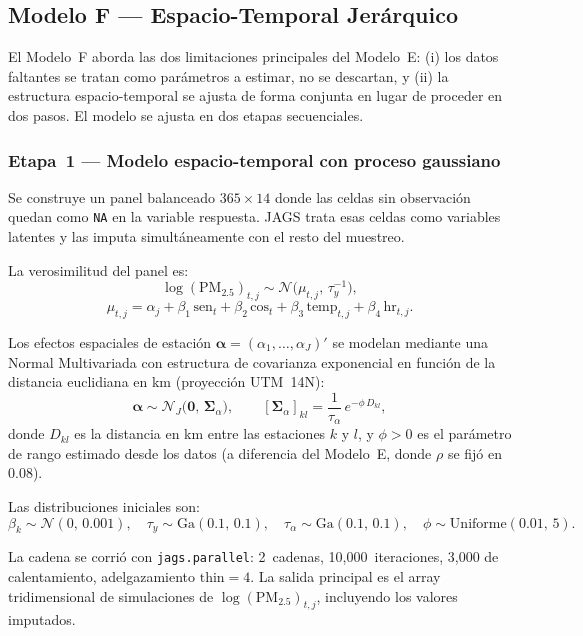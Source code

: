 \documentclass[12pt]{article}
\begin{document}
\subsection{Modelo F --- Espacio-Temporal Jer\'arquico}

El Modelo~F aborda las dos limitaciones principales del Modelo~E:
(i) los datos faltantes se tratan como par\'ametros a estimar, no se
descartan, y (ii) la estructura espacio-temporal se ajusta de forma
conjunta en lugar de proceder en dos pasos.
El modelo se ajusta en dos etapas secuenciales.

\subsubsection*{Etapa~1 --- Modelo espacio-temporal con proceso gaussiano}

Se construye un panel balanceado $365 \times 14$ donde las celdas
sin observaci\'on quedan como \texttt{NA} en la variable respuesta.
JAGS trata esas celdas como variables latentes y las imputa
simult\'aneamente con el resto del muestreo.

La verosimilitud del panel es:
\[
  \log(\text{PM}_{2.5})_{t,j} \sim \mathcal{N}\!\bigl(\mu_{t,j},\,\tau_y^{-1}\bigr),
\]
\[
  \mu_{t,j} = \alpha_j + \beta_1\,\text{sen}_t + \beta_2\,\text{cos}_t
              + \beta_3\,\text{temp}_{t,j} + \beta_4\,\text{hr}_{t,j}.
\]

Los efectos espaciales de estaci\'on $\boldsymbol\alpha = (\alpha_1,\ldots,\alpha_J)'$
se modelan mediante una Normal Multivariada con estructura de covarianza
exponencial en funci\'on de la distancia euclidiana en km (proyecci\'on UTM~14N):
\[
  \boldsymbol\alpha \sim \mathcal{N}_J\!\bigl(\mathbf{0},\,
  \boldsymbol\Sigma_\alpha\bigr), \qquad
  [\boldsymbol\Sigma_\alpha]_{kl} = \frac{1}{\tau_\alpha}\,e^{-\phi\, D_{kl}},
\]
donde $D_{kl}$ es la distancia en km entre las estaciones $k$ y $l$,
y $\phi > 0$ es el par\'ametro de rango estimado desde los datos
(a diferencia del Modelo~E, donde $\rho$ se fij\'o en 0.08\textdegree).

Las distribuciones iniciales son:
\[
  \beta_k \sim \mathcal{N}(0,\,0.001), \quad
  \tau_y \sim \text{Ga}(0.1,\,0.1), \quad
  \tau_\alpha \sim \text{Ga}(0.1,\,0.1), \quad
  \phi \sim \text{Uniforme}(0.01,\,5).
\]

La cadena se corri\'o con \texttt{jags.parallel}: 2~cadenas,
10{,}000~iteraciones, 3{,}000 de calentamiento, adelgazamiento $\text{thin}=4$.
La salida principal es el array tridimensional de simulaciones de
$\log(\text{PM}_{2.5})_{t,j}$, incluyendo los valores imputados.
\end{document}

